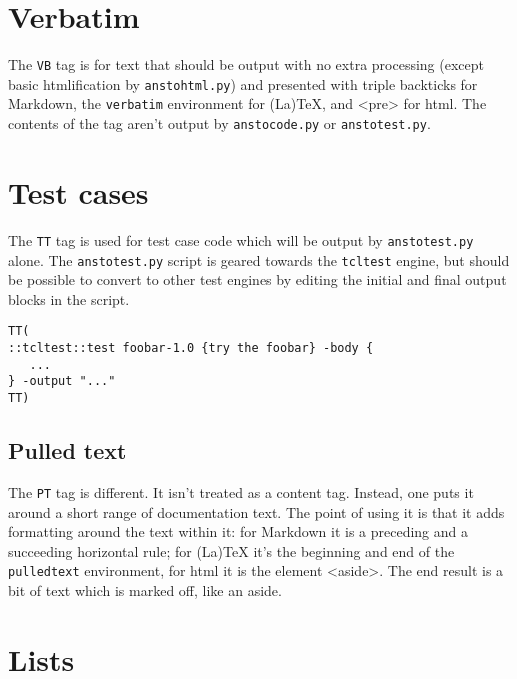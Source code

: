 \section{Verbatim}
\label{verbatim}

The \texttt{VB} tag is for text that should be output with no extra processing (except basic htmlification by \texttt{anstohtml.py}) and presented with triple backticks for Markdown, the \texttt{verbatim} environment for (La)TeX, and <pre> for html. The contents of the tag aren't output by \texttt{anstocode.py} or \texttt{anstotest.py}.

\section{Test cases}
\label{test-cases}

The \texttt{TT} tag is used for test case code which will be output by \texttt{anstotest.py} alone. The \texttt{anstotest.py} script is geared towards the \texttt{tcltest} engine, but should be possible to convert to other test engines by editing the initial and final output blocks in the script.

\begin{verbatim}
TT(
::tcltest::test foobar-1.0 {try the foobar} -body {
   ...
} -output "..."
TT)
\end{verbatim}

\begin{pulledtext}

\section{Pulled text}
\label{pulled-text}

The \texttt{PT} tag is different. It isn't treated as a content tag. Instead, one puts it around a short range of documentation text. The point of using it is that it adds formatting around the text within it: for Markdown it is a preceding and a succeeding horizontal rule; for (La)TeX it's the beginning and end of the \texttt{pulledtext} environment, for html it is the element <aside>. The end result is a bit of text which is marked off, like an aside.
\end{pulledtext}

\section{Lists}
\label{lists}

